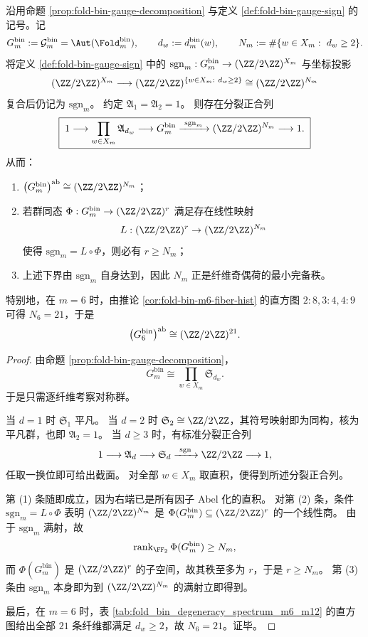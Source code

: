 \begin{theorem}[纤维奇偶荷的分裂正合列与最小完备秩]\label{thm:xi-foldbin-parity-charge-split-exact-minrank}
沿用命题 \ref{prop:fold-bin-gauge-decomposition} 与定义 \ref{def:fold-bin-gauge-sign} 的记号。记
\[
G_m^{\mathrm{bin}}:=\mathcal{G}^{\mathrm{bin}}_m=\Aut(\Fold_m^{\mathrm{bin}}),
\qquad
d_w:=d_m^{\mathrm{bin}}(w),
\qquad
N_m:=\#\{w\in X_m:\ d_w\ge 2\}.
\]
将定义 \ref{def:fold-bin-gauge-sign} 中的
\(
\mathrm{sgn}_m:G_m^{\mathrm{bin}}\to (\ZZ/2\ZZ)^{X_m}
\)
与坐标投影
\[
(\ZZ/2\ZZ)^{X_m}
\longrightarrow
(\ZZ/2\ZZ)^{\{w\in X_m:\ d_w\ge 2\}}
\cong
(\ZZ/2\ZZ)^{N_m}
\]
复合后仍记为 \(\mathrm{sgn}_m\)。
约定 \(\mathfrak A_1=\mathfrak A_2=1\)。
则存在分裂正合列
\[
\boxed{\;
1\longrightarrow \prod_{w\in X_m}\mathfrak A_{d_w}
\longrightarrow G_m^{\mathrm{bin}}
\xrightarrow{\ \mathrm{sgn}_m\ }
(\ZZ/2\ZZ)^{N_m}
\longrightarrow 1.
\;}
\]
从而：
\begin{enumerate}
  \item \(\bigl(G_m^{\mathrm{bin}}\bigr)^{\mathrm{ab}}\cong (\ZZ/2\ZZ)^{N_m}\)；
  \item 若群同态 \(\Phi:G_m^{\mathrm{bin}}\to (\ZZ/2\ZZ)^r\) 满足存在线性映射
  \[
  L:(\ZZ/2\ZZ)^r\to (\ZZ/2\ZZ)^{N_m}
  \]
  使得 \(\mathrm{sgn}_m=L\circ\Phi\)，则必有 \(r\ge N_m\)；
  \item 上述下界由 \(\mathrm{sgn}_m\) 自身达到，因此 \(N_m\) 正是纤维奇偶荷的最小完备秩。
\end{enumerate}
特别地，在 \(m=6\) 时，由推论 \ref{cor:fold-bin-m6-fiber-hist} 的直方图 \(2:8,3:4,4:9\) 可得 \(N_6=21\)，于是
\[
\bigl(G_6^{\mathrm{bin}}\bigr)^{\mathrm{ab}}\cong (\ZZ/2\ZZ)^{21}.
\]
\end{theorem}
\begin{proof}
由命题 \ref{prop:fold-bin-gauge-decomposition}，
\[
G_m^{\mathrm{bin}}
\cong
\prod_{w\in X_m}\mathfrak S_{d_w}.
\]
于是只需逐纤维考察对称群。

当 \(d=1\) 时 \(\mathfrak S_1\) 平凡。
当 \(d=2\) 时 \(\mathfrak S_2\cong \ZZ/2\ZZ\)，其符号映射即为同构，核为平凡群，也即 \(\mathfrak A_2=1\)。
当 \(d\ge 3\) 时，有标准分裂正合列
\[
1\longrightarrow \mathfrak A_d
\longrightarrow \mathfrak S_d
\xrightarrow{\ \mathrm{sgn}\ }
\ZZ/2\ZZ
\longrightarrow 1,
\]
任取一换位即可给出截面。
对全部 \(w\in X_m\) 取直积，便得到所述分裂正合列。

第 (1) 条随即成立，因为右端已是所有因子 Abel 化的直积。
对第 (2) 条，条件 \(\mathrm{sgn}_m=L\circ\Phi\) 表明 \((\ZZ/2\ZZ)^{N_m}\) 是 \(\Phi(G_m^{\mathrm{bin}})\subseteq (\ZZ/2\ZZ)^r\) 的一个线性商。
由于 \(\mathrm{sgn}_m\) 满射，故
\[
\operatorname{rank}_{\FF_2}\Phi(G_m^{\mathrm{bin}})
\ge N_m,
\]
而 \(\Phi(G_m^{\mathrm{bin}})\) 是 \((\ZZ/2\ZZ)^r\) 的子空间，故其秩至多为 \(r\)，于是 \(r\ge N_m\)。
第 (3) 条由 \(\mathrm{sgn}_m\) 本身即为到 \((\ZZ/2\ZZ)^{N_m}\) 的满射立即得到。

最后，在 \(m=6\) 时，表 \ref{tab:fold_bin_degeneracy_spectrum_m6_m12} 的直方图给出全部 \(21\) 条纤维都满足 \(d_w\ge 2\)，故 \(N_6=21\)。证毕。
\end{proof}


